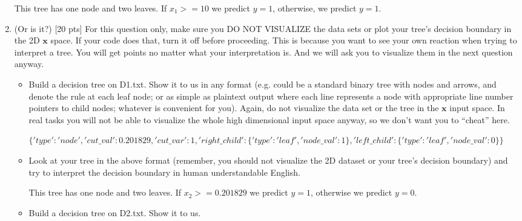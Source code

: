 \documentclass[a4paper]{article}
\theoremstyle{definition}
\def\x{\mathbf x}
\newenvironment{soln}{
    \leavevmode\color{blue}\ignorespaces
}{}
\begin{document}
\begin{enumerate}
\begin{soln}
  This tree has one node and two leaves. If $x_1 >= 10$ we predict $y = 1$, otherwise, we predict $y = 1$.
\end{soln}

\item (Or is it?)  [20 pts] For this question only, make sure you DO NOT VISUALIZE the data sets or plot your tree's decision boundary in the 2D $\x$ space.  If your code does that, turn it off before proceeding.  This is because you want to see your own reaction when trying to interpret a tree.  You will get points no matter what your interpretation is.
And we will ask you to visualize them in the next question anyway.
  \begin{itemize}
  
  \item Build a decision tree on D1.txt.  Show it to us in any format (e.g. could be a standard binary tree with nodes and arrows, and denote the rule at each leaf node; or as simple as plaintext output where each line represents a node with appropriate line number pointers to child nodes; whatever is convenient for you). Again, do not visualize the data set or the tree in the $\x$ input space.  In real tasks you will not be able to visualize the whole high dimensional input space anyway, so we don't want you to ``cheat'' here. 
  
  \begin{soln}
    $\{'type': 'node', 'cut\_val': 0.201829, 'cut\_var': 1, 'right\_child': \{'type': 'leaf', 'node\_val': 1\}, 'left\_child': \{'type': 'leaf', 'node\_val': 0\}\}$
  \end{soln}

  \item Look at your tree in the above format (remember, you should not visualize the 2D dataset or your tree's decision boundary) and try to interpret the decision boundary in human understandable English.
  
  \begin{soln}
    This tree has one node and two leaves. If $x_2 >= 0.201829$ we predict $y = 1$, otherwise we predict $y = 0$.
  \end{soln}
  
  \item Build a decision tree on D2.txt.  Show it to us. 


\end{itemize}
\end{enumerate}
\end{document}
